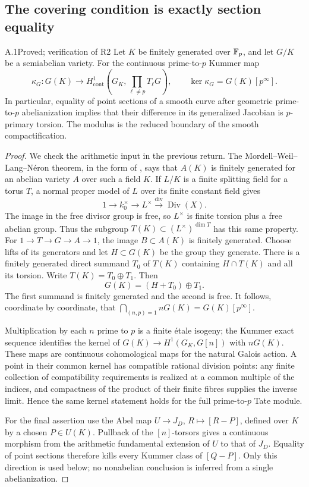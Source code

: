 \subsection{The covering condition is exactly section equality}

\begin{claim}{A.1}{Proved; verification of R2}
Let $K$ be finitely generated over $\mathbb F_p$, and let $G/K$ be a
semiabelian variety. For the continuous prime-to-$p$ Kummer map
\[
 \kappa_G:G(K)\longrightarrow
 H^1_{\mathrm{cont}}\left(G_K,\prod_{\ell\ne p}T_\ell G\right),
 \qquad
 \ker\kappa_G=G(K)[p^\infty].
\]
In particular, equality of point sections of a smooth curve after
geometric prime-to-$p$ abelianization implies that their difference in
its generalized Jacobian is $p$-primary torsion. The modulus is the
reduced boundary of the smooth compactification.
\end{claim}
\begin{proof}
We check the arithmetic input in the previous return. The
Mordell--Weil--Lang--N\'eron theorem, in the form of
\citet[I, Theorem 16.7]{A_Milne2008}, says that $A(K)$ is finitely
generated for an abelian variety $A$ over such a field $K$.
If $L/K$ is a finite splitting field for a torus $T$, a normal proper
model of $L$ over its finite constant field gives
\[
 1\longrightarrow k_0^\times\longrightarrow L^\times
 \xrightarrow{\operatorname{div}}\operatorname{Div}(X).
\]
The image in the free divisor group is free, so $L^\times$ is finite
torsion plus a free abelian group. Thus the subgroup
$T(K)\subset (L^\times)^{\dim T}$ has this same property.
For $1\to T\to G\to A\to1$, the image $B\subset A(K)$ is finitely
generated. Choose lifts of its generators and let $H\subset G(K)$ be
the group they generate. There is a finitely generated direct summand
$T_0$ of $T(K)$ containing $H\cap T(K)$ and all its torsion. Write
$T(K)=T_0\oplus T_1$. Then
\[
 G(K)=(H+T_0)\oplus T_1.
\]
The first summand is finitely generated and the second is free. It
follows, coordinate by coordinate, that
$\bigcap_{(n,p)=1}nG(K)=G(K)[p^\infty]$.

Multiplication by each $n$ prime to $p$ is a finite \'etale isogeny;
the Kummer exact sequence identifies the kernel of
$G(K)\to H^1(G_K,G[n])$ with $nG(K)$. These maps are continuous
cohomological maps for the natural Galois action. A point in their
common kernel has compatible rational division points: any finite
collection of compatibility requirements is realized at a common
multiple of the indices, and compactness of the product of their
finite fibres supplies the inverse limit. Hence the same kernel
statement holds for the full prime-to-$p$ Tate module.

For the final assertion use the Abel map
$U\to J_D$, $R\mapsto[R-P]$, defined over $K$ by a chosen
$P\in U(K)$. Pullback of the $[n]$-torsors gives a continuous
morphism from the arithmetic fundamental extension of $U$ to that of
$J_D$. Equality of point sections therefore kills every Kummer class
of $[Q-P]$. Only this direction is used below; no nonabelian conclusion
is inferred from a single abelianization.
\end{proof}

